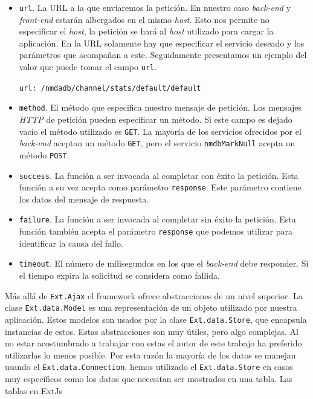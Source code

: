 	\begin{itemize}
		\item	\texttt{url}. La URL a la que enviaremos la petición. En nuestro caso \emph{back-end} y \emph{front-end} estarán albergados en
			el mismo \emph{host}. Esto nos permite no especificar el \emph{host}, la petición se hará al \emph{host} utilizado para cargar
			la aplicación. En la URL solamente hay que especificar el servicio deseado y los parámetros que acompañan a este.
			Seguidamente presentamos un ejemplo del valor que puede tomar el campo \texttt{url}.
    				\begin{center} \texttt{url: \cc/nmdadb/channel/stats/default/default\cc}  \end{center}
		\item	\texttt{method}. El método que especifica nuestro mensaje de petición. Los mensajes \emph{HTTP} de petición pueden especificar
			un método. Si este campo es dejado vacío el método utilizado es \texttt{GET}. La mayoría de los servicios ofrecidos por el
			\emph{back-end} aceptan un método \texttt{GET}, pero el servicio \texttt{nmdbMarkNull} acepta un método \texttt{POST}.
		\item	\texttt{success}. La función a ser invocada al completar con éxito la petición. Esta función a su vez acepta como parámetro
		  	\texttt{response}. Este parámetro contiene los datos del mensaje de respuesta.
		\item	\texttt{failure}. La función a ser invocada al completar sin éxito la petición. Esta función también acepta el parámetro
		  	\texttt{response} que podemos utilizar para identificar la causa del fallo.
		\item	\texttt{timeout}. El número de milisegundos en los que el \emph{back-end} debe responder. Si el tiempo expira la solicitud se
		  	considera como fallida. 
	\end{itemize}
	Más allá de \texttt{Ext.Ajax} el framework ofrece abstracciones de un nivel superior. La clase \texttt{Ext.data.Model} es una representación
	de un objeto utilizado por nuestra aplicación. Estos modelos son usados por la clase \texttt{Ext.data.Store}, que encapsula instancias de
	estos. Estas abstracciones son muy útiles, pero algo complejas. Al no estar acostumbrado a trabajar con estas el autor de este trabajo ha
	preferido utilizarlas lo menos posible. Por esta razón la mayoría de los datos se manejan usando el \texttt{Ext.data.Connection}, hemos
	utilizado el \texttt{Ext.data.Store} en casos muy específicos como los datos que necesitan ser mostrados en una tabla. Las tablas en ExtJs
